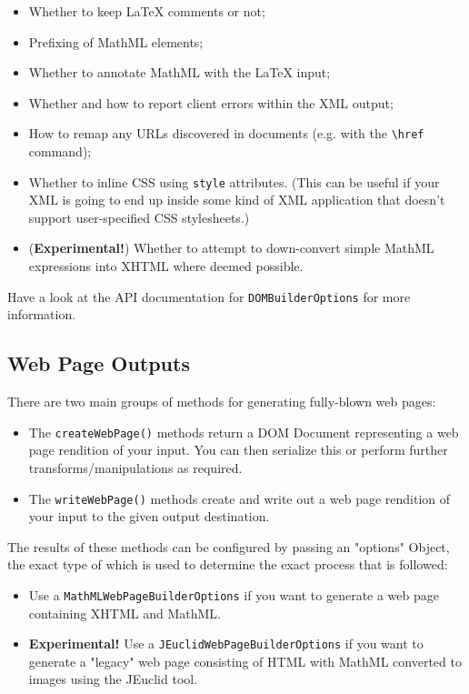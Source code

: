 \begin{itemize}
  \item Whether to keep LaTeX comments or not;
  \item Prefixing of MathML elements;
  \item Whether to annotate MathML with the LaTeX input;
  \item Whether and how to report client errors within the XML output;
  \item How to remap any URLs discovered in documents (e.g. with the \verb|\href| command);
  \item Whether to inline CSS using \verb|style| attributes. (This can be useful if your XML
    is going to end up inside some kind of XML application that doesn't support user-specified
    CSS stylesheets.)
  \item (\textbf{Experimental!}) Whether to attempt to down-convert simple MathML expressions
    into XHTML where deemed possible.
\end{itemize}

Have a look at the API documentation for \verb|DOMBuilderOptions| for more information.

\subsection*{Web Page Outputs}

There are two main groups of methods for generating fully-blown web pages:

\begin{itemize}

  \item The \verb|createWebPage()| methods return a DOM Document representing a
    web page rendition of your input. You can then serialize this or perform
    further transforms/manipulations as required.

  \item The \verb|writeWebPage()| methods create and write out a web page
    rendition of your input to the given output destination.

\end{itemize}

The results of these methods can be configured by passing an "options" Object, the
exact type of which is used to determine the exact process that is followed:

\begin{itemize}
  \item Use a \verb|MathMLWebPageBuilderOptions| if you want to generate a web
    page containing XHTML and MathML.

  \item \textbf{Experimental!} Use a \verb|JEuclidWebPageBuilderOptions| if you
    want to generate a "legacy" web page consisting of HTML with MathML converted
    to images using the JEuclid tool.
\end{itemize}

